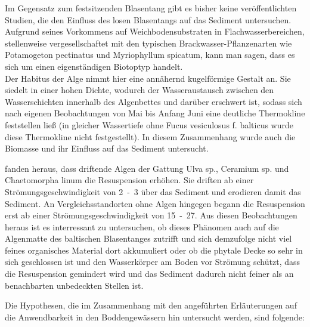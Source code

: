 Im Gegensatz zum festsitzenden Blasentang gibt es bisher keine veröffentlichten Studien, die den Einfluss des losen Blasentangs auf das Sediment untersuchen. Aufgrund seines Vorkommens auf Weichbodensubstraten in Flachwasserbereichen, stellenweise vergesellschaftet mit den typischen Brackwasser-Pflanzenarten wie Potamogeton pectinatus und Myriophyllum spicatum, kann man sagen, dass es sich um einen eigenständigen Biotoptyp handelt.\\
Der Habitus der Alge nimmt hier eine annähernd kugelförmige Gestalt an. Sie siedelt in einer hohen Dichte, wodurch der Wasseraustausch zwischen den Wasserschichten innerhalb des Algenbettes und darüber erschwert ist, sodass sich nach eigenen Beobachtungen von Mai bis Anfang Juni eine deutliche Thermokline feststellen ließ (in gleicher Wassertiefe ohne Fucus vesiculosus f. balticus wurde diese Thermokline nicht festgestellt). In diesem Zusammenhang wurde auch die Biomasse und ihr Einfluss auf das Sediment untersucht.

\cite{canal-verges_2010} fanden heraus, dass driftende Algen der Gattung Ulva sp., Ceramium sp. und Chaetomorpha linum die Resuspension erhöhen. Sie driften ab einer Strömungsgeschwindigkeit von \unit{2-3}{\centi\metre\per\second} über das Sediment und erodieren damit das Sediment. An Vergleichsstandorten ohne Algen hingegen begann die Resuspension erst ab einer Strömungsgeschwindigkeit von \unit{15-27}{\centi\metre\per\second}. Aus diesen Beobachtungen heraus ist es interressant zu untersuchen, ob dieses Phänomen auch auf die Algenmatte des baltischen Blasentanges zutrifft und sich demzufolge nicht viel feines organisches Material dort akkumuliert oder ob die phytale Decke so sehr in sich geschlossen ist und den Wasserkörper am Boden vor Strömung schützt, dass die Resuspension gemindert wird und das Sediment dadurch nicht feiner als an benachbarten unbedeckten Stellen ist.

Die Hypothesen, die im Zusammenhang mit den angeführten Erläuterungen auf die Anwendbarkeit in den Boddengewässern hin untersucht werden, sind folgende:


